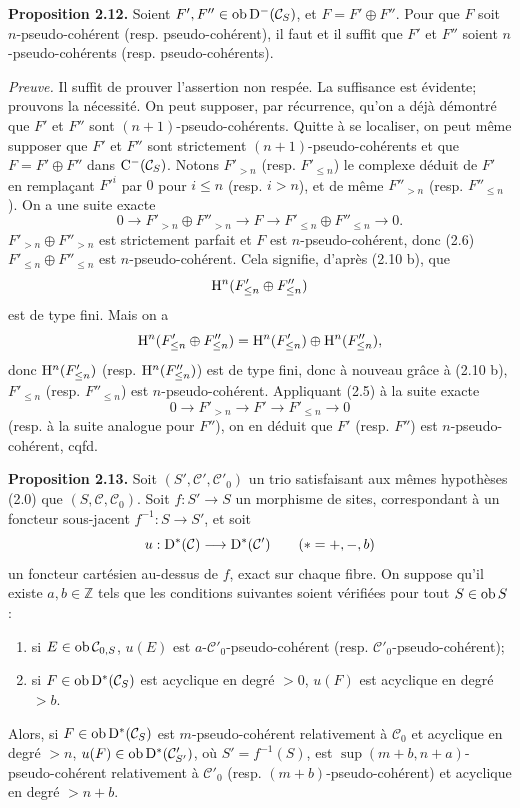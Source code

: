 \documentclass[11pt]{article}
\begin{document}
\textbf{Proposition 2.12.} Soient \(F',F''\in\operatorname{ob}\mathrm D^-(\mathcal C_S)\), et \(F=F'\oplus F''\). Pour que \(F\) soit \(n\)-pseudo-cohérent (resp. pseudo-cohérent), il faut et il suffit que \(F'\) et \(F''\) soient \(n\)-pseudo-cohérents (resp. pseudo-cohérents).

\emph{Preuve.} Il suffit de prouver l'assertion non respée. La suffisance est évidente; prouvons la nécessité. On peut supposer, par récurrence, qu'on a déjà démontré que \(F'\) et \(F''\) sont \((n+1)\)-pseudo-cohérents. Quitte à se localiser, on peut même supposer que \(F'\) et \(F''\) sont strictement \((n+1)\)-pseudo-cohérents et que \(F=F'\oplus F''\) dans \(\mathrm C^-(\mathcal C_S)\). Notons \(F'_{>n}\) (resp. \(F'_{\leq n}\)) le complexe déduit de \(F'\) en remplaçant \(F'^i\) par \(0\) pour \(i\leq n\) (resp. \(i>n\)), et de même \(F''_{>n}\) (resp. \(F''_{\leq n}\)). On a une suite exacte
\[
  0\longrightarrow F'_{>n}\oplus F''_{>n}\longrightarrow F
  \longrightarrow F'_{\leq n}\oplus F''_{\leq n}\longrightarrow 0 .
\]
\(F'_{>n}\oplus F''_{>n}\) est strictement parfait et \(F\) est \(n\)-pseudo-cohérent, donc (2.6) \(F'_{\leq n}\oplus F''_{\leq n}\) est \(n\)-pseudo-cohérent. Cela signifie, d'après (2.10 b), que
\[
  \mathrm H^n(F'_{\leq n}\oplus F''_{\leq n})
\]
est de type fini. Mais on a
\[
  \mathrm H^n(F'_{\leq n}\oplus F''_{\leq n})
  =\mathrm H^n(F'_{\leq n})\oplus\mathrm H^n(F''_{\leq n}),
\]
donc \(\mathrm H^n(F'_{\leq n})\) (resp. \(\mathrm H^n(F''_{\leq n})\)) est de type fini, donc à nouveau grâce à (2.10 b), \(F'_{\leq n}\) (resp. \(F''_{\leq n}\)) est \(n\)-pseudo-cohérent. Appliquant (2.5) à la suite exacte
\[
  0\longrightarrow F'_{>n}\longrightarrow F'\longrightarrow F'_{\leq n}\longrightarrow 0
\]
(resp. à la suite analogue pour \(F''\)), on en déduit que \(F'\) (resp. \(F''\)) est \(n\)-pseudo-cohérent, cqfd.

\textbf{Proposition 2.13.} Soit \((S',\mathcal C',\mathcal C'_0)\) un trio satisfaisant aux mêmes hypothèses (2.0) que \((S,\mathcal C,\mathcal C_0)\). Soit \(f:S'\to S\) un morphisme de sites, correspondant à un foncteur sous-jacent \(f^{-1}:S\to S'\), et soit
\[
  u:\mathrm D^*(\mathcal C)\longrightarrow \mathrm D^*(\mathcal C')\qquad (*=+,-,b)
\]
un foncteur cartésien au-dessus de \(f\), exact sur chaque fibre. On suppose qu'il existe \(a,b\in\mathbb Z\) tels que les conditions suivantes soient vérifiées pour tout \(S\in\operatorname{ob} S\) :
\begin{enumerate}[label=(\roman*)]
\item si \(E\in\operatorname{ob}\mathcal C_{0,S}\), \(u(E)\) est \(a\)-\(\mathcal C'_0\)-pseudo-cohérent (resp. \(\mathcal C'_0\)-pseudo-cohérent);
\item si \(F\in\operatorname{ob}\mathrm D^*(\mathcal C_S)\) est acyclique en degré \(>0\), \(u(F)\) est acyclique en degré \(>b\).
\end{enumerate}
Alors, si \(F\in\operatorname{ob}\mathrm D^*(\mathcal C_S)\) est \(m\)-pseudo-cohérent relativement à \(\mathcal C_0\) et acyclique en degré \(>n\), \(u(F)\in\operatorname{ob}\mathrm D^*(\mathcal C'_{S'})\), où \(S'=f^{-1}(S)\), est \(\sup(m+b,n+a)\)-pseudo-cohérent relativement à \(\mathcal C'_0\) (resp. \((m+b)\)-pseudo-cohérent) et acyclique en degré \(>n+b\).
\end{document}

